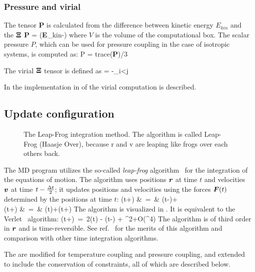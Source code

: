 \subsubsection{Pressure and virial}
The  
tensor {\bf P} is calculated from the difference between 
kinetic energy $E_{kin}$ and the  ${\bf \Xi}$
\beq
{\bf P} =  ({\bf E}_{kin}-{\bf \Xi})
\label{eqn:P}
\eeq
where $V$ is the volume of the computational box. 
The scalar pressure $P$, which can be used for pressure coupling in the case
of isotropic systems, is computed as:
\beq
P       = {\rm trace}({\bf P})/3
\eeq

The virial ${\bf \Xi}$ tensor is defined as 
\beq
{\bf \Xi} = -\half \sum_{i<j} \rvij \otimes \Fvij 
\eeq

In  the
implementation  in {\gromacs} of the virial computation is described.

\subsection{Update configuration}
\label{subsec:update}
\begin{figure}
\centerline{}
\caption[The Leap-Frog integration method.]{The Leap-Frog integration method. The algorithm is called
Leap-Frog  (Haasje Over), because r and v are leaping
like  frogs over each others back.}
\label{fig:leapfrog}
\end{figure}

The {\gromacs} MD program utilizes the so-called {\em leap-frog} 
algorithm~\cite{Hockney74} for the integration of the equations of
motion.  The  
algorithm uses positions $\mbox{\boldmath ${r}$}$ at time $t$ and
velocities $\mbox{\boldmath ${v}$}$ at time $t-{\frac {\Delta t}{2}}$; it updates positions and
velocities using the forces
$\mbox{\boldmath ${F}$}(t)$ determined by the positions at time $t$: 
\bea
{}(t+\hDt)  &~=~&   (t-\hDt)+\Dt   \\
(t+\Dt)   &~=~&   (t)+(t+\hDt)\Dt
\eea
The algorithm is visualized in .
It is equivalent to the Verlet~\cite{Verlet67} algorithm:
\beq
{}(t+\Dt)~=~2(t) - (t-\Dt) + \Dt^2+O(\Dt^4)
\eeq
The algorithm is of third order in $\mbox{\boldmath ${r}$}$ and is time-reversible.
See ref.~\cite{Berendsen86b} for the merits of this algorithm and comparison
with other time integration algorithms.
 
The  are modified for temperature coupling
 and pressure coupling, and extended to include the conservation of
constraints, all of which are described below.

